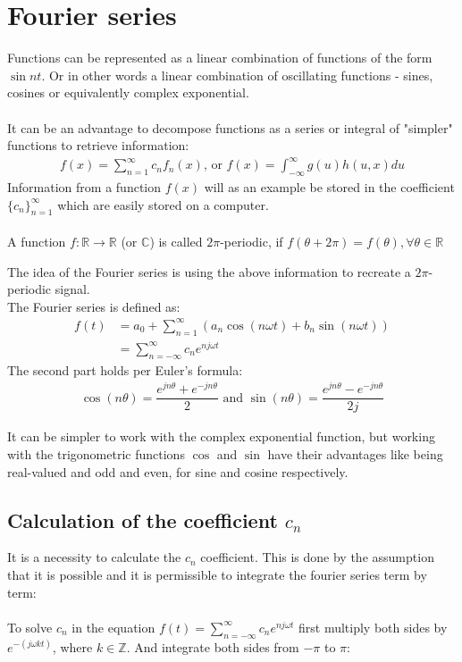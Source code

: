 \section{Fourier series}
Functions can be represented as a linear combination of functions of the form $\sin nt$.
Or in other words a linear combination of oscillating functions - sines, cosines or equivalently complex exponential.
\\\\
It can be an advantage to decompose functions as a series or integral of "simpler" functions to retrieve information:
\begin{align*}
	f(x) = \sum_{n=1}^\infty c_n f_n(x)\text{, or } f(x)= \int_{-\infty}^\infty g(u) h(u,x) du
\end{align*}
Information from a function $f(x)$ will as an example be stored in the coefficient $\{c_n\}_{n=1}^\infty$ which are easily stored on a computer.
\\\\ 
A function $f: \mathbb{R}\to\mathbb{R}$ (or $\mathbb{C}$) is called $2\pi$-periodic, if $f(\theta + 2\pi) = f(\theta), \forall\theta\in\mathbb{R}$

The idea of the Fourier series is using the above information to recreate a $2\pi$- periodic signal.\\
The Fourier series is defined as:
\begin{align*}
	f(t) &= a_0 + \sum_{n=1}^\infty(a_n \cos(n \omega t) + b_n \sin(n \omega t))\\
	&= \sum_{n=-\infty}^{\infty} c_n e^{n j\omega t} 
\end{align*}
The second part holds per Euler's formula:
\begin{align*}
	\cos(n\theta) = \dfrac{e^{j n \theta} + e^{-j n \theta}}{2} \text{ and } \sin(n \theta) = \dfrac{e^{jn\theta}-e^{-jn\theta}}{2j}
\end{align*}

It can be simpler to work with the complex exponential function, but working with the trigonometric functions $\cos$ and $\sin$ have their advantages like being real-valued and odd and even, for sine and cosine respectively.

\subsection{Calculation of the coefficient $c_n$}
It is a necessity to calculate the $c_n$ coefficient.
This is done by the assumption that it is possible and it is permissible to integrate the fourier series term by term:\\
\\
To solve $c_n$ in the equation $f(t)= \sum_{n=-\infty}^{\infty} c_n e^{n j\omega t}$ first multiply both sides by $e^{-(j\omega k t)}$, where $k\in \mathbb{Z}$. And integrate both sides from $-\pi$ to $\pi$:

